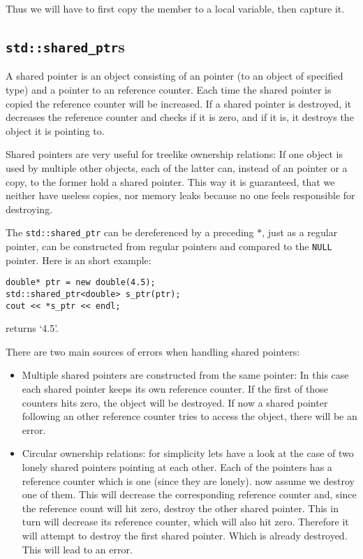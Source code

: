 \documentclass{article}
\newcommand{\NULL}{\texttt{NULL} pointer\xspace}
\begin{document}
Thus we will have to first copy the member to a local variable, then capture it.

\subsection{\texttt{std::shared\_ptr}s}

A shared pointer is an object consisting of an pointer (to an object of specified type) and a pointer to an reference counter. Each time the shared pointer is copied the reference counter will be increased. If a shared pointer is destroyed, it decreases the reference counter and checks if it is zero, and if it is, it destroys the object it is pointing to.

Shared pointers are very useful for treelike ownership relations: If one object is used by multiple other objects, each of the latter can, instead of an pointer or a copy, to the former hold a shared pointer. This way it is guaranteed, that we neither have useless copies, nor memory leaks because no one feels responsible for destroying.

The \texttt{std::shared\_ptr} can be dereferenced by a preceding $*$, just as a regular pointer, can be constructed from regular pointers and compared to the \NULL. Here is an short example:

\begin{lstlisting}
double* ptr = new double(4.5);
std::shared_ptr<double> s_ptr(ptr);
cout << *s_ptr << endl;
\end{lstlisting}
returns \lq 4.5\rq.

There are two main sources of errors when handling shared pointers:
\begin{itemize}
\item Multiple shared pointers are constructed from the same pointer: In this case each shared pointer keeps its own reference counter. If the first of those counters hits zero, the object will be destroyed. If now a shared pointer following an other reference counter tries to access the object, there will be an error.
\item Circular ownership relations: for simplicity lets have a look at the case of two lonely shared pointers pointing at each other. Each of the pointers has a reference counter which is one (since they are lonely). now assume we destroy one of them. This will decrease the corresponding reference counter and, since the reference count will hit zero, destroy the other shared pointer. This in turn will decrease its reference counter, which will also hit zero. Therefore it will attempt to destroy the first shared pointer. Which is already destroyed. This will lead to an error.
\end{itemize}
\end{document}
